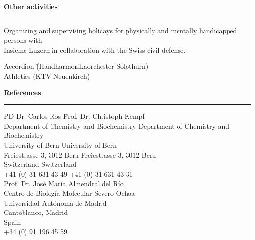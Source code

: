 \vspace{0.275 cm}

\large
\textbf{Other activities}
\noindent\rule[3mm]{\linewidth}{1pt}

\normalsize
\vspace{-0.25cm}
Organizing and supervising holidays for physically and mentally handicapped persons with\\ Insieme Luzern in collaboration with the Swiss civil defense.
\vspace{-0.05 cm}
\begin{tabbing}
Accordion \=(Handharmonikaorchester Solothurn) \\[0.2 cm]
Athletics \>(KTV Neuenkirch) 
\end{tabbing}



\vspace{0.275 cm}
\large
\textbf{References}
\noindent\rule[3mm]{\linewidth}{1pt}

 
\vspace{-0.5 cm}
\begin{tabbing}
PD Dr. Carlos Ros \hspace{4.6 cm} \= Prof. Dr. Christoph Kempf \\
Department of Chemistry and Biochemistry \> Department of Chemistry and Biochemistry \\
University of Bern \> University of Bern \\
Freiestrasse 3, 3012 Bern \> Freiestrasse 3, 3012 Bern \\
Switzerland \> Switzerland \\ [0.1 cm]
+41 (0) 31 631 43 49 \> +41 (0) 31 631 43 31\\ [0.55 cm]

Prof. Dr. José María Almendral del Río \\
Centro de Biología Molecular Severo Ochoa \\
Universidad Autónoma de Madrid \\
Cantoblanco,  Madrid \\
Spain \\ [0.1 cm]
+34 (0) 91 196 45 59






\end{tabbing}

\restoregeometry
{}